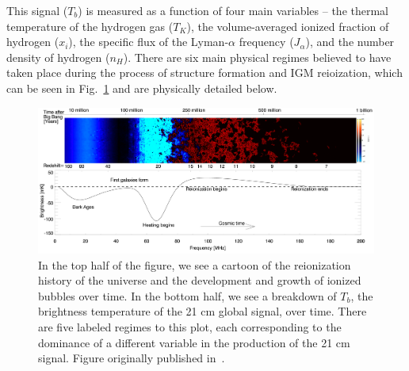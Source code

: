 This signal ($T_b$) is measured as a function of four main variables -- the 
thermal temperature of the hydrogen gas ($T_K$), the volume-averaged ionized 
fraction of hydrogen ($x_i$), the specific flux of the Lyman-$\alpha$ frequency 
($J_\alpha$), and the number density of hydrogen ($n_H$). There are six main 
physical regimes believed to have taken place during the process of structure 
formation and IGM reioization, which can be seen in 
Fig.~\ref{fig:global-signal} and are physically detailed below.

\begin{figure}
    \begin{center}
    \includegraphics[width=\linewidth]{global_signal.png}
    \end{center}
    \caption{
        In the top half of the figure, we see a cartoon of the reionization 
        history of the universe and the development and growth of ionized 
        bubbles over time. In the bottom half, we see a breakdown of $T_b$, the 
        brightness temperature of the 21 cm global signal, over time. There are 
        five labeled regimes to this plot, each corresponding to the dominance 
        of a different variable in the production of the 21 cm signal. Figure 
        originally published in~\citealp{pritchard-loeb2012}.
    }
    \label{fig:global-signal}
\end{figure}

